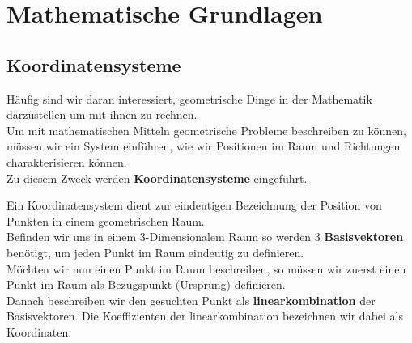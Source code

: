 
\section{Mathematische Grundlagen}
\label{chap:Style}

\subsection{Koordinatensysteme}

Häufig sind wir daran interessiert, geometrische Dinge in der Mathematik darzustellen um mit ihnen zu rechnen. \\
Um mit mathematischen Mitteln geometrische Probleme beschreiben zu können, müssen wir ein System einführen, wie wir
Positionen im Raum und Richtungen charakterisieren können. \\
Zu diesem Zweck werden \textbf{Koordinatensysteme} eingeführt.

\beginip
Ein Koordinatensystem dient zur eindeutigen Bezeichnung der Position von Punkten in einem geometrischen Raum.  \\
Befinden wir uns in einem 3-Dimensionalem Raum so werden 3 \textbf{Basisvektoren} benötigt, um jeden Punkt im Raum eindeutig zu definieren. \\
Möchten wir nun einen Punkt im Raum beschreiben, so müssen wir zuerst einen Punkt im Raum als Bezugspunkt (Ursprung) definieren. \\
Danach beschreiben wir den gesuchten Punkt als \textbf{linearkombination} der Basisvektoren. Die Koeffizienten der linearkombination bezeichnen wir dabei als Koordinaten.
\iend


